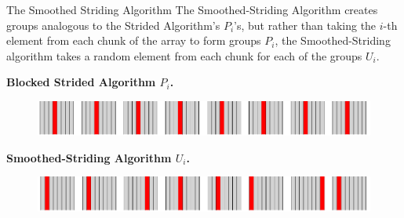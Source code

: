 \documentclass[xcolor=x11names, svgnames, rgb]{beamer}
\newcommand{\polylog}{\operatorname{polylog}}
\begin{document}

\begin{frame}[t]{The Smoothed Striding Algorithm} 
	The Smoothed-Striding Algorithm creates groups analogous to the Strided Algorithm's $P_i$'s, but rather than taking the $i$-th element from each chunk of the array to form groups $P_i$, the Smoothed-Striding algorithm takes a random element from each chunk for each of the groups $U_i$.

	\textbf{Blocked Strided Algorithm $P_i$.}
	\begin{figure}
		\includegraphics[width=\linewidth]{imgs/stridedAlgHighlighted.png}
	\end{figure}
	\textbf{Smoothed-Striding Algorithm $U_i$.}
	\begin{figure}
		\includegraphics[width=\linewidth]{imgs/smoothedStridingAlgHighlighted.png}
	\end{figure}
\end{frame}
\end{document}
